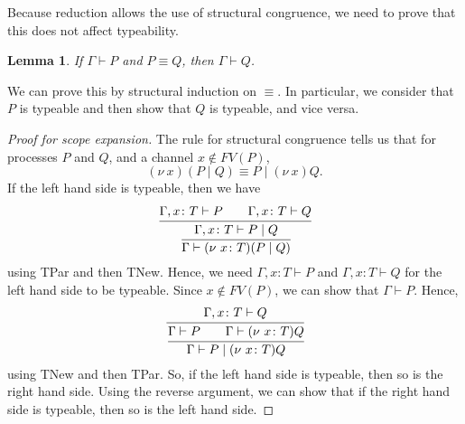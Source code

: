 \documentclass[a4paper, openany]{memoir}
\newtheorem{lemma}[proposition]{Lemma}
\theoremstyle{definition}
\begin{document}
    Because reduction allows the use of structural congruence, we need to prove that this does not affect typeability.
    \begin{lemma}
        If $\Gamma \vdash P$ and $P \equiv Q$, then $\Gamma \vdash Q$.
    \end{lemma}
    \noindent We can prove this by structural induction on $\equiv$. In particular, we consider that $P$ is typeable and then show that $Q$ is typeable, and vice versa.
    \begin{proof}[Proof for scope expansion]
        The rule for structural congruence tells us that for processes $P$ and $Q$, and a channel $x \not\in FV(P)$,
        \[(\nu \ x)(P \mid Q) \equiv P \mid (\nu \ x)Q.\]
        If the left hand side is typeable, then we have
        \[\cfrac{\Gamma, x \colon T \vdash P \qquad \Gamma, x \colon T \vdash Q}{\cfrac{\Gamma, x \colon T \vdash P \mid Q}{\Gamma \vdash (\nu \ x \colon T)(P \mid Q)}}\]
        using TPar and then TNew. Hence, we need $\Gamma, x \colon T \vdash P$ and $\Gamma, x \colon T \vdash Q$ for the left hand side to be typeable. Since $x \not\in FV(P)$, we can show that $\Gamma \vdash P$. Hence,
        \[\cfrac{\Gamma, x \colon T \vdash Q}{\cfrac{\Gamma \vdash P \qquad \Gamma \vdash (\nu \ x \colon T)Q}{\Gamma \vdash P \mid (\nu \ x \colon T)Q}}\]
        using TNew and then TPar. So, if the left hand side is typeable, then so is the right hand side. Using the reverse argument, we can show that if the right hand side is typeable, then so is the left hand side.
    \end{proof}
\end{document}
